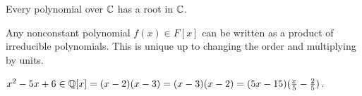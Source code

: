 \documentclass[class=article,crop=false]{standalone}
\begin{document}
\begin{thm}
Every polynomial over $ \mathbb{C}$ has a root in $ \mathbb{C}$.
\end{thm}

\begin{thm}[]
	Any nonconstant polynomial $ f(x) \in F[x]$ can be written as a product of irreducible polynomials. This is unique up to changing the order and multiplying by units.
\end{thm}
\begin{eg}[]
	$ x^2-5x+6 \in \mathbb{Q}[x] = (x-2)(x-3) = (x-3)(x-2) = (5x-15)(\frac{x}{5}-\frac{2}{5})$.
\end{eg}
\end{document}
